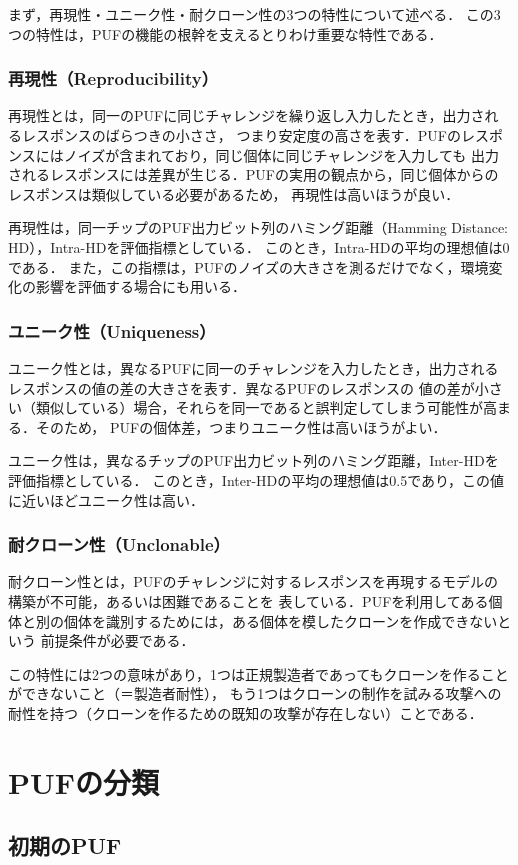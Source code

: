 \documentclass[survey]{ieicej}%
\begin{document}
まず，再現性・ユニーク性・耐クローン性の3つの特性について述べる．
この3つの特性は，PUFの機能の根幹を支えるとりわけ重要な特性である．
\subsubsection{再現性（Reproducibility）}
再現性とは，同一のPUFに同じチャレンジを繰り返し入力したとき，出力されるレスポンスのばらつきの小ささ，
つまり安定度の高さを表す．PUFのレスポンスにはノイズが含まれており，同じ個体に同じチャレンジを入力しても
出力されるレスポンスには差異が生じる．PUFの実用の観点から，同じ個体からのレスポンスは類似している必要があるため，
再現性は高いほうが良い．

再現性は，同一チップのPUF出力ビット列のハミング距離（Hamming Distance: HD），Intra-HDを評価指標としている．
このとき，Intra-HDの平均の理想値は0である．
また，この指標は，PUFのノイズの大きさを測るだけでなく，環境変化の影響を評価する場合にも用いる．
\subsubsection{ユニーク性（Uniqueness）}
ユニーク性とは，異なるPUFに同一のチャレンジを入力したとき，出力されるレスポンスの値の差の大きさを表す．異なるPUFのレスポンスの
値の差が小さい（類似している）場合，それらを同一であると誤判定してしまう可能性が高まる．そのため，
PUFの個体差，つまりユニーク性は高いほうがよい．

ユニーク性は，異なるチップのPUF出力ビット列のハミング距離，Inter-HDを評価指標としている．
このとき，Inter-HDの平均の理想値は0.5であり，この値に近いほどユニーク性は高い．
\subsubsection{耐クローン性（Unclonable）}
耐クローン性とは，PUFのチャレンジに対するレスポンスを再現するモデルの構築が不可能，あるいは困難であることを
表している．PUFを利用してある個体と別の個体を識別するためには，ある個体を模したクローンを作成できないという
前提条件が必要である．

この特性には2つの意味があり，1つは正規製造者であってもクローンを作ることができないこと（＝製造者耐性），
もう1つはクローンの制作を試みる攻撃への耐性を持つ（クローンを作るための既知の攻撃が存在しない）ことである．


\section{PUFの分類}
\subsection{初期のPUF}
\end{document}
